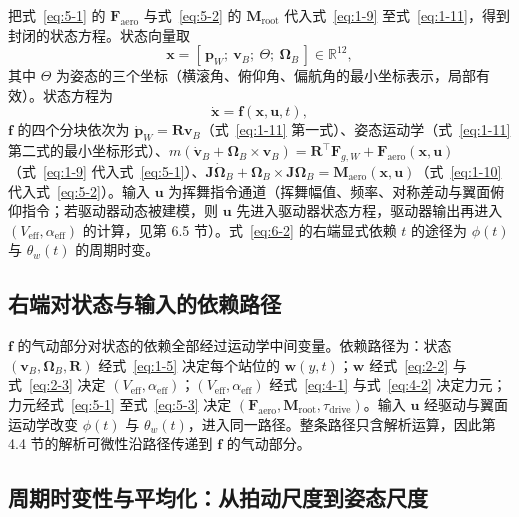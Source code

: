 \documentclass[11pt,a4paper]{ctexart}
\numberwithin{equation}{section}
\newcommand{\R}{\mathbb{R}}
\begin{document}
把式~\eqref{eq:5-1} 的 $\bm{F}_{\text{aero}}$ 与式~\eqref{eq:5-2} 的 $\bm{M}_{\text{root}}$ 代入式~\eqref{eq:1-9} 至式~\eqref{eq:1-11}，得到封闭的状态方程。状态向量取
\begin{equation}
  \bm{x} = [\,\bm{p}_W;\ \bm{v}_B;\ \Theta;\ \bm{\Omega}_B\,] \in \R^{12}, \label{eq:6-1}
\end{equation}
其中 $\Theta$ 为姿态的三个坐标（横滚角、俯仰角、偏航角的最小坐标表示，局部有效）。状态方程为
\begin{equation}
  \dot{\bm{x}} = \bm{f}(\bm{x}, \bm{u}, t), \label{eq:6-2}
\end{equation}
$\bm{f}$ 的四个分块依次为 $\dot{\bm{p}}_W = \bm{R}\bm{v}_B$（式~\eqref{eq:1-11} 第一式）、姿态运动学（式~\eqref{eq:1-11} 第二式的最小坐标形式）、$m(\dot{\bm{v}}_B + \bm{\Omega}_B \times \bm{v}_B) = \bm{R}^{\top}\bm{F}_{g,W} + \bm{F}_{\text{aero}}(\bm{x}, \bm{u})$（式~\eqref{eq:1-9} 代入式~\eqref{eq:5-1}）、$\bm{J}\dot{\bm{\Omega}}_B + \bm{\Omega}_B \times \bm{J}\bm{\Omega}_B = \bm{M}_{\text{aero}}(\bm{x}, \bm{u})$（式~\eqref{eq:1-10} 代入式~\eqref{eq:5-2}）。输入 $\bm{u}$ 为挥舞指令通道（挥舞幅值、频率、对称差动与翼面俯仰指令；若驱动器动态被建模，则 $\bm{u}$ 先进入驱动器状态方程，驱动器输出再进入 $(V_{\text{eff}}, \alpha_{\text{eff}})$ 的计算，见第 6.5 节）。式~\eqref{eq:6-2} 的右端显式依赖 $t$ 的途径为 $\phi(t)$ 与 $\theta_w(t)$ 的周期时变。

\subsection{右端对状态与输入的依赖路径}

$\bm{f}$ 的气动部分对状态的依赖全部经过运动学中间变量。依赖路径为：状态 $(\bm{v}_B, \bm{\Omega}_B, \bm{R})$ 经式~\eqref{eq:1-5} 决定每个站位的 $\bm{w}(y, t)$；$\bm{w}$ 经式~\eqref{eq:2-2} 与式~\eqref{eq:2-3} 决定 $(V_{\text{eff}}, \alpha_{\text{eff}})$；$(V_{\text{eff}}, \alpha_{\text{eff}})$ 经式~\eqref{eq:4-1} 与式~\eqref{eq:4-2} 决定力元；力元经式~\eqref{eq:5-1} 至式~\eqref{eq:5-3} 决定 $(\bm{F}_{\text{aero}}, \bm{M}_{\text{root}}, \tau_{\text{drive}})$。输入 $\bm{u}$ 经驱动与翼面运动学改变 $\phi(t)$ 与 $\theta_w(t)$，进入同一路径。整条路径只含解析运算，因此第 4.4 节的解析可微性沿路径传递到 $\bm{f}$ 的气动部分。

\subsection{周期时变性与平均化：从拍动尺度到姿态尺度}
\end{document}
